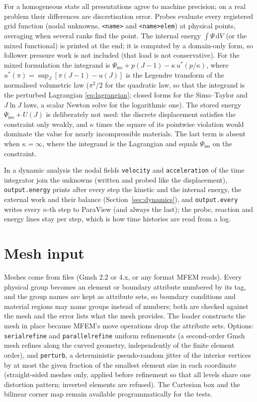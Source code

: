 \documentclass[11pt]{article}
\newcommand{\ud}{\,\mathrm{d}}
\DeclareRobustCommand{\code}[1]{{\def\_{\textunderscore\allowbreak}\texttt{#1}}}
\begin{document}
For a homogeneous state all presentations agree to machine precision; on a
real problem their differences are discretisation error.  Probes evaluate
every registered grid function (nodal unknowns, \code{<name>} and
\code{<name>\_elem}) at physical points, averaging when several ranks find
the point.  The internal energy $\int\Psi\ud V$ (or the mixed functional)
is printed at the end; it is computed by a domain-only form, so follower
pressure work is not included (that load is not conservative).  For the
mixed formulation the integrand is
$\Psi_{\mathrm{iso}} + p(J-1) - \kappa\,u^*(p/\kappa)$, where
$u^*(\pi) = \sup_J[\pi(J-1) - u(J)]$ is the Legendre transform of the
normalised volumetric law ($\pi^2/2$ for the quadratic law, so that the
integrand is the perturbed Lagrangian \eqref{eq:lagrangian}; closed forms
for the Simo--Taylor and $J\ln J$ laws, a scalar Newton solve for the
logarithmic one).  The stored energy $\Psi_{\mathrm{iso}} + U(J)$ is
deliberately not used: the discrete displacement satisfies the constraint
only weakly, and $\kappa$ times the square of its pointwise violation
would dominate the value for nearly incompressible materials.  The last
term is absent when $\kappa = \infty$, where the integrand is the
Lagrangian and equals $\Psi_{\mathrm{iso}}$ on the constraint.

In a dynamic analysis the nodal fields \code{velocity} and
\code{acceleration} of the time integrator join the unknowns (written and
probed like the displacement), \code{output.energy} prints after every step
the kinetic and the internal energy, the external work and their balance
(Section~\ref{sec:dynamics}), and \code{output.every} writes every $n$-th
step to ParaView (and always the last); the probe, reaction and energy
lines stay per step, which is how time histories are read from a log.

\section{Mesh input}

Meshes come from files (Gmsh 2.2 or 4.x, or any format MFEM reads).  Every
physical group becomes an element or boundary attribute numbered by its tag,
and the group names are kept as attribute sets, so boundary conditions and
material regions may name groups instead of numbers; both are checked
against the mesh and the error lists what the mesh provides.  The loader
constructs the mesh in place because MFEM's move operations drop the
attribute sets.  Options: \code{serial\_refine} and \code{parallel\_refine}
uniform refinements (a second-order Gmsh mesh refines along the curved
geometry, independently of the finite element order), and \code{perturb},
a deterministic pseudo-random jitter of the interior vertices by at most
the given fraction of the smallest element size in each coordinate
(straight-sided meshes only, applied before refinement so that all levels
share one distortion pattern; inverted elements are refused).  The
Cartesian box and the bilinear corner map remain available
programmatically for the tests.
\end{document}
